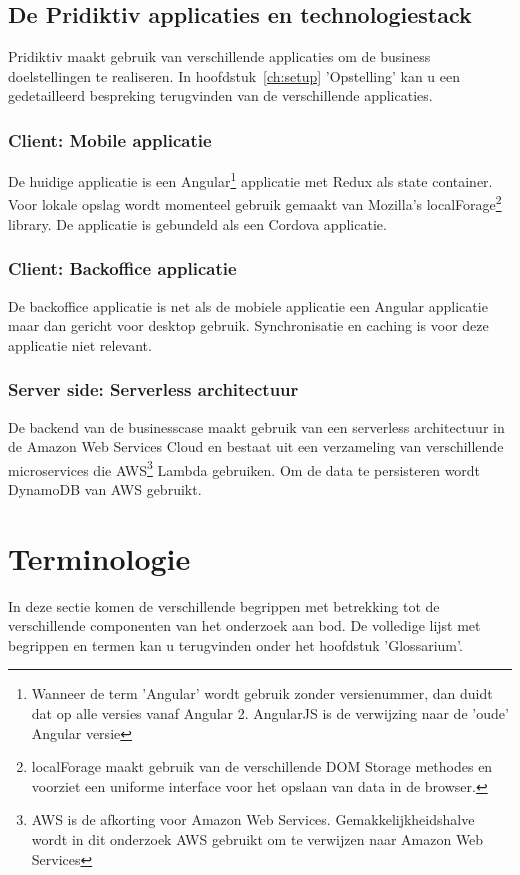 \subsection{De Pridiktiv applicaties en technologiestack}
Pridiktiv maakt gebruik van verschillende applicaties om de business doelstellingen te realiseren. In hoofdstuk~\ref{ch:setup} 'Opstelling' kan u een gedetailleerd bespreking terugvinden van de verschillende applicaties.
\subsubsection{Client: Mobile applicatie}
De huidige applicatie is een Angular\footnote{Wanneer de term 'Angular' wordt gebruik zonder versienummer, dan duidt dat op alle versies vanaf Angular 2. AngularJS is de verwijzing naar de 'oude' Angular versie} applicatie met Redux als state container. Voor lokale opslag wordt momenteel gebruik gemaakt van Mozilla's localForage\footnote{localForage maakt gebruik van de verschillende DOM Storage methodes en voorziet een uniforme interface voor het opslaan van data in de browser.} library. De applicatie is gebundeld als een Cordova applicatie.
\subsubsection{Client: Backoffice applicatie}
De backoffice applicatie is net als de mobiele applicatie een Angular applicatie maar dan gericht voor desktop gebruik. Synchronisatie en caching is voor deze applicatie niet relevant.
\clearpage
\subsubsection{Server side: Serverless architectuur}
De backend van de businesscase maakt gebruik van een serverless architectuur in de Amazon Web Services Cloud en bestaat uit een verzameling van verschillende microservices die AWS\footnote{AWS is de afkorting voor Amazon Web Services. Gemakkelijkheidshalve wordt in dit onderzoek AWS gebruikt om te verwijzen naar Amazon Web Services} Lambda gebruiken. Om de data te persisteren wordt DynamoDB van AWS gebruikt.

\section{Terminologie}
\label{sec:terminologie}
In deze sectie komen de verschillende begrippen met betrekking tot de verschillende componenten van het onderzoek aan bod. De volledige lijst met begrippen en termen kan u terugvinden onder het hoofdstuk 'Glossarium'.
